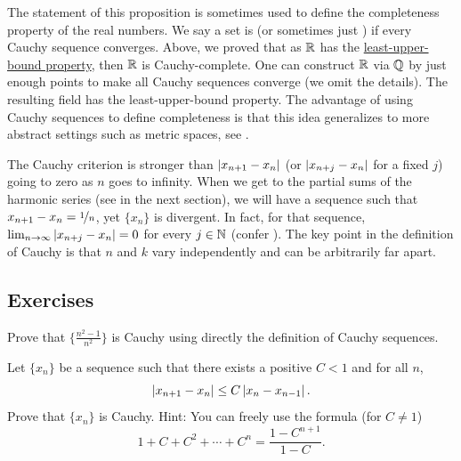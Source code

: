 \begin{remark}
The statement of this proposition is sometimes used to define the
completeness property of the real numbers.  We say a set is
\emph{} (or sometimes just \emph{})
if every Cauchy sequence converges.
Above, we proved that
as ${\mathbb{R}}$ has the \hyperref[defn:lub]{least-upper-bound property}, then ${\mathbb{R}}$ is 
Cauchy-complete.
One can construct ${\mathbb{R}}$ via
 ${\mathbb{Q}}$ by  just enough points to make all
Cauchy sequences converge (we omit the details).
The resulting field has the
least-upper-bound property.
The advantage of using Cauchy
sequences to define completeness is that this idea generalizes to
more abstract settings such as metric spaces, see .
\end{remark}

The Cauchy criterion is stronger than 
$\left\lvert {x_{n+1}-x_n} \right\rvert$ (or $\left\lvert {x_{n+j}-x_n} \right\rvert$ for a fixed $j$) going to zero as
$n$ goes to
infinity.  When we get to the partial sums of the harmonic series
(see  in the next section), we will have
a sequence such that $x_{n+1}-x_n = \nicefrac{1}{n}$, yet $\{ x_n \}$ is
divergent.  In fact, for that sequence,
$\lim_{n\to\infty} \left\lvert {x_{n+j}-x_n} \right\rvert = 0$ for
every $j \in {\mathbb{N}}$ (confer ).
The key point in the definition of Cauchy is that $n$ and $k$
vary independently and can be arbitrarily far apart.

\subsection{Exercises}

\begin{exercise}
Prove that $\{ \frac{n^2-1}{n^2} \}$ is Cauchy using directly the definition
of Cauchy sequences.
\end{exercise}

\begin{exercise}
Let $\{ x_n \}$ be a sequence such that
there exists a positive $C < 1$ and for all $n$,
\begin{equation*}
\left\lvert {x_{n+1} - x_n} \right\rvert \leq C \left\lvert {x_{n}-x_{n-1}} \right\rvert .
\end{equation*}
Prove that $\{ x_n \}$ is Cauchy.
Hint:  You can freely use the formula (for $C \not= 1$)
\begin{equation*}
1+ C+ C^2 + \cdots + C^n = \frac{1-C^{n+1}}{1-C}.
\end{equation*}
\end{exercise}

